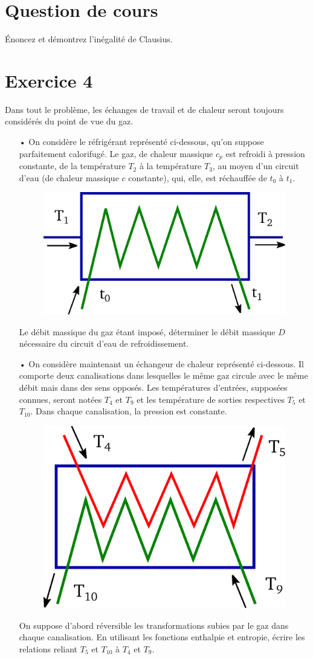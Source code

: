 \documentclass{report}
\begin{document}
\newpage

\section*{Question de cours}
Énoncez et démontrez l’inégalité de Clausius.

\section*{Exercice 4}

Dans tout le problème, les échanges de travail et de chaleur seront toujours considérés du point de vue du gaz.
\begin{itemize}

\item[•] On considère le réfrigérant représenté ci-dessous, qu'on suppose parfaitement calorifugé. Le gaz, de chaleur massique $c_{p}$ est refroidi à pression constante, de la température $T_{2}$ à la température $T_{3}$, au moyen d'un circuit d'eau (de chaleur massique $c$ constante), qui, elle, est réchauffée de $t_{0}$ à $t_{1}$.

\begin{figure}[!h]
\centering
\includegraphics[width=0.3\linewidth]{refrigirant.pdf}
\end{figure}

Le débit massique du gaz étant imposé, déterminer le débit massique $D$ nécessaire du circuit d'eau de refroidissement.
\item[•] On considère maintenant un échangeur de chaleur représenté ci-dessous. Il comporte deux canalisations dans lesquelles le même gaz circule avec le même débit mais dans des sens opposés. Les températures d'entrées, supposées connues, seront notées $T_{4}$ et $T_{9}$ et les température de sorties respectives $T_{5}$ et $T_{10}$. Dans chaque canalisation, la pression est constante.
\begin{figure}[!h]
\centering
\includegraphics[width=0.3\linewidth]{echangeur.pdf}
\end{figure}
On suppose d'abord réversible les transformations subies par le gaz dans chaque canalisation. En utilisant les fonctions enthalpie et entropie, écrire les relations reliant $T_{5}$ et $T_{10}$ à $T_{4}$ et $T_{9}$.


\end{itemize}
\end{document}
